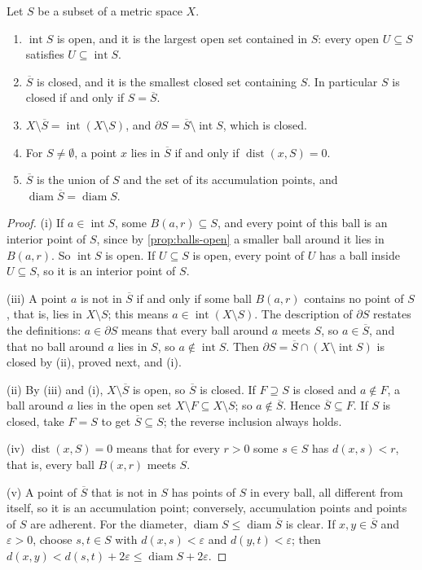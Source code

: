 \begin{proposition}
\label{prop:closure}
Let $S$ be a subset of a metric space $X$.
\begin{enumerate}
\item $\operatorname{int}S$ is open, and it is the largest open set contained in $S$: every open $U\subseteq S$ satisfies $U\subseteq\operatorname{int}S$.
\item $\overline S$ is closed, and it is the smallest closed set containing $S$. In particular $S$ is closed if and only if $S=\overline S$.
\item $X\setminus\overline S=\operatorname{int}(X\setminus S)$, and $\partial S=\overline S\setminus\operatorname{int}S$, which is closed.
\item For $S\ne\emptyset$, a point $x$ lies in $\overline S$ if and only if $\operatorname{dist}(x,S)=0$.
\item $\overline S$ is the union of $S$ and the set of its accumulation points, and $\operatorname{diam}\overline S=\operatorname{diam}S$.
\end{enumerate}
\end{proposition}

\begin{proof}
(i) If $a\in\operatorname{int}S$, some $B(a,r)\subseteq S$, and every point of this ball is an interior point of $S$, since by \cref{prop:balls-open} a smaller ball around it lies in $B(a,r)$. So $\operatorname{int}S$ is open. If $U\subseteq S$ is open, every point of $U$ has a ball inside $U\subseteq S$, so it is an interior point of $S$.

(iii) A point $a$ is not in $\overline S$ if and only if some ball $B(a,r)$ contains no point of $S$, that is, lies in $X\setminus S$; this means $a\in\operatorname{int}(X\setminus S)$. The description of $\partial S$ restates the definitions: $a\in\partial S$ means that every ball around $a$ meets $S$, so $a\in\overline S$, and that no ball around $a$ lies in $S$, so $a\notin\operatorname{int}S$. Then $\partial S=\overline S\cap(X\setminus\operatorname{int}S)$ is closed by (ii), proved next, and (i).

(ii) By (iii) and (i), $X\setminus\overline S$ is open, so $\overline S$ is closed. If $F\supseteq S$ is closed and $a\notin F$, a ball around $a$ lies in the open set $X\setminus F\subseteq X\setminus S$; so $a\notin\overline S$. Hence $\overline S\subseteq F$. If $S$ is closed, take $F=S$ to get $\overline S\subseteq S$; the reverse inclusion always holds.

(iv) $\operatorname{dist}(x,S)=0$ means that for every $r>0$ some $s\in S$ has $d(x,s)<r$, that is, every ball $B(x,r)$ meets $S$.

(v) A point of $\overline S$ that is not in $S$ has points of $S$ in every ball, all different from itself, so it is an accumulation point; conversely, accumulation points and points of $S$ are adherent. For the diameter, $\operatorname{diam}S\le\operatorname{diam}\overline S$ is clear. If $x,y\in\overline S$ and $\varepsilon>0$, choose $s,t\in S$ with $d(x,s)<\varepsilon$ and $d(y,t)<\varepsilon$; then $d(x,y)<d(s,t)+2\varepsilon\le\operatorname{diam}S+2\varepsilon$.
\end{proof}

